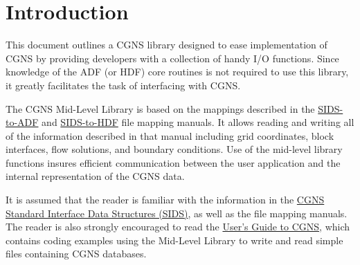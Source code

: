 \section{Introduction}
\label{s:intro}
\thispagestyle{plain}

This document outlines a CGNS library designed to ease implementation of
CGNS by providing developers with a collection of handy I/O functions.
Since knowledge of the ADF (or HDF) core routines is not required to use
this library, it greatly facilitates the task of interfacing with CGNS.

The CGNS Mid-Level Library is based on the mappings described in the
\href{../filemap/filemap.pdf}{SIDS-to-ADF} and
\href{../filemap_hdf/filemap.pdf}{SIDS-to-HDF} file mapping manuals.
It allows reading and writing all of the information described in
that manual including grid coordinates, block interfaces, flow
solutions, and boundary conditions.
Use of the mid-level library functions insures efficient
communication between the user application and the internal
representation of the CGNS data.

It is assumed that the reader is familiar with the information in the
\href{../sids/sids.pdf}{CGNS Standard Interface Data Structures
(SIDS)}, as well as the file mapping manuals.
The reader is also strongly encouraged to read the
\href{../user/user.pdf}{User's Guide to CGNS}, which contains
coding examples using the Mid-Level Library to write and read simple
files containing CGNS databases.
